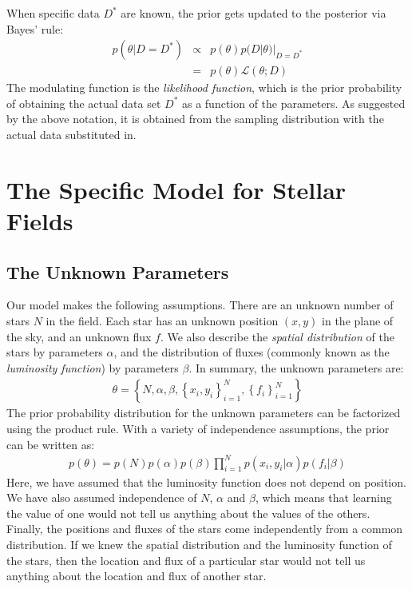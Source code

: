 \documentclass[letterpaper, 11pt]{article}
\begin{document}
When specific data $D^*$ are known, the prior gets updated to the posterior
via Bayes' rule:
\begin{eqnarray}
p(\theta|D=D^*) &\propto& p(\theta)p(D|\theta)|_{D=D^*} \\
&=& p(\theta)\mathcal{L}(\theta; D)
\end{eqnarray}
The modulating function is the {\it likelihood function}, which is the prior
probability of obtaining the actual data set $D^*$ as a function of the
parameters. As suggested by the above notation, it is obtained from the
sampling distribution with the actual data substituted in.

\section{The Specific Model for Stellar Fields}

\subsection{The Unknown Parameters}
Our model makes the following assumptions. There are an unknown number of stars
$N$ in the field. Each star has an unknown
position $(x,y)$ in the plane of the sky, and an unknown flux $f$. We also
describe the {\it spatial distribution} of the stars by parameters
$\alpha$, and the distribution of fluxes (commonly known as the {\it luminosity
function}) by parameters $\beta$. In summary, the unknown parameters are:
\begin{eqnarray}
\theta = \left\{N, \alpha, \beta, \left\{x_i, y_i\right\}_{i=1}^N, 
\left\{f_i\right\}_{i=1}^N\right\}
\end{eqnarray}
The prior probability distribution for the unknown parameters can be factorized
using the product rule. With a variety of independence assumptions, the prior
can be written as:
\begin{eqnarray}
p(\theta) = p(N)p(\alpha)p(\beta)\prod_{i=1}^N p(x_i, y_i | \alpha)
p(f_i | \beta) 
\end{eqnarray}
Here, we have assumed that the luminosity function does not depend on position.
We have also assumed independence of $N$, $\alpha$ and $\beta$, which means that
learning the value of one would not tell us anything about the values of the
others. Finally, the positions and fluxes of the stars come independently from
a common distribution. If we knew the spatial distribution and the luminosity
function of the stars, then the location and flux of a particular star would
not tell us anything about the location and flux of another star.
\end{document}
